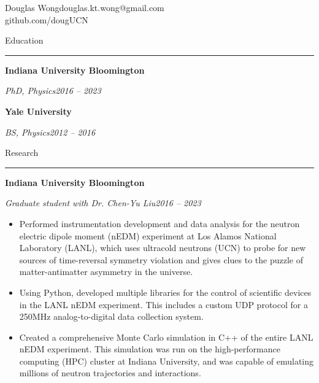 \newpage
\pagestyle{empty} %
\begin{singlespace}
{\parindent0pt %
{\large Douglas Wong}\hfill{douglas.kt.wong@gmail.com}\\ \null \hfill{github.com/dougUCN}

\vspace{\baselineskip}
{\large Education}\vspace{0.25\baselineskip}\hrule\vspace{0.75\baselineskip}

\textbf{Indiana University Bloomington}

\textit{PhD, Physics}\hfill\textit{2016 -- 2023}

\vspace{\baselineskip}

\textbf{Yale University}

\textit{BS, Physics}\hfill\textit{2012 -- 2016}

\vspace{\baselineskip}
{\large Research} \vspace{0.25\baselineskip}\hrule\vspace{0.75\baselineskip}

\textbf{Indiana University Bloomington}

\textit{Graduate student with Dr. Chen-Yu Liu}\hfill\textit{2016 -- 2023}
\begin{itemize}[noitemsep,topsep=0pt]
    \item Performed instrumentation development and data analysis for the neutron electric dipole moment (nEDM) experiment at Los Alamos National Laboratory (LANL), which uses ultracold neutrons (UCN) to probe for new sources of time-reversal symmetry violation and gives clues to the puzzle of matter-antimatter asymmetry in the universe.
    \item Using Python, developed multiple libraries for the control of scientific devices in the LANL nEDM experiment. This includes a custom UDP protocol for a 250MHz analog-to-digital data collection system.
    \item Created a comprehensive Monte Carlo simulation in C++ of the entire LANL nEDM experiment. This simulation was run on the high-performance computing (HPC) cluster at Indiana University, and was capable of emulating millions of neutron trajectories and interactions.
\end{itemize}

}
\end{singlespace}
